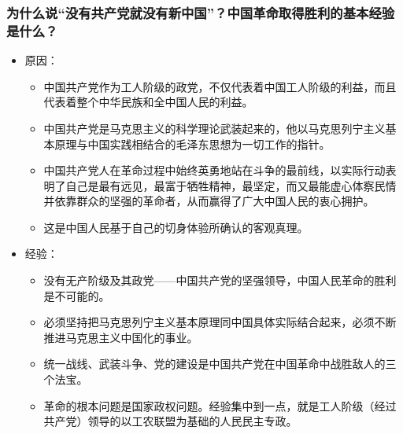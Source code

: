 \documentclass{article}
\begin{document}
\subsubsection{为什么说“没有共产党就没有新中国”？中国革命取得胜利的基本经验是什么？}
\begin{itemize}
    \item 原因：
    \begin{itemize}
        \item 中国共产党作为工人阶级的政党，不仅代表着中国工人阶级的利益，而且代表着整个中华民族和全中国人民的利益。
        \item 中国共产党是马克思主义的科学理论武装起来的，他以马克思列宁主义基本原理与中国实践相结合的毛泽东思想为一切工作的指针。
        \item 中国共产党人在革命过程中始终英勇地站在斗争的最前线，以实际行动表明了自己是最有远见，最富于牺牲精神，最坚定，而又最能虚心体察民情并依靠群众的坚强的革命者，从而赢得了广大中国人民的衷心拥护。
        \item 这是中国人民基于自己的切身体验所确认的客观真理。
    \end{itemize}
    \item 经验：
    \begin{itemize}
        \item 没有无产阶级及其政党——中国共产党的坚强领导，中国人民革命的胜利是不可能的。
        \item 必须坚持把马克思列宁主义基本原理同中国具体实际结合起来，必须不断推进马克思主义中国化的事业。
        \item 统一战线、武装斗争、党的建设是中国共产党在中国革命中战胜敌人的三个法宝。
        \item 革命的根本问题是国家政权问题。经验集中到一点，就是工人阶级（经过共产党）领导的以工农联盟为基础的人民民主专政。
    \end{itemize}
\end{itemize}
\end{document}
